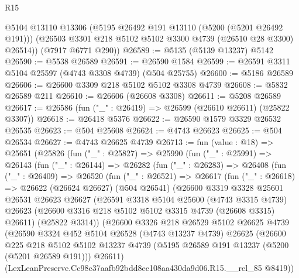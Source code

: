 \begin{lexlean}{R15}
\begin{coremodule}
{{{{{{{{{{{        @5104
        @13110
        @13306
        (@5195 @26492 @191 @13110 (@5200 (@5201 @26492 @191)))
        (@26503 @3301 @218 @5102 @5102 @3300 @4739 (@26510 @28 @3300) @26514))
      (@7917 @6771 @290))
@26589 := @5135 (@5139 @13237) @5142
@26590 := @5538 @26589
@26591 := @26590 @1584
@26599 := @26591 @3311 @5104 @25597 (@4743 @3308 @4739) (@504 @25755)
@26600 := @5186 @26589
@26606 := @26600 @3309 @218 @5102 @5102 @3308 @4739
@26608 := @5832 @26589 @211
@26610 := @26606 (@26608 @3308)
@26611 := @5208 @26589
@26617 := @26586 (fun ("_" : @26419) => @26599 (@26610 @26611) (@25822 @3307))
@26618 := @26418 @5376
@26622 := @26590 @1579 @3329 @26532 @26535
@26623 := @504 @25608
@26624 := @4743 @26623
@26625 := @504 @26534
@26627 := @4743 @26625 @4739
@26713 := fun (value : @18) =>
  @25651
    (@25826
      (fun ("_" : @25827) =>
      @25990
        (fun ("_" : @25991) =>
        @26143
          (fun ("_" : @26144) =>
          @26282
            (fun ("_" : @26283) =>
            @26408
              (fun ("_" : @26409) =>
              @26520
                (fun ("_" : @26521) =>
                @26617
                  (fun ("_" : @26618) =>
                  @26622
                    (@26624 @26627)
                    (@504 @26541)
                    (@26600
                      @3319
                      @3328
                      @25601
                      @26531
                      @26623
                      @26627
                      (@26591
                        @3318
                        @5104
                        @25600
                        (@4743 @3315 @4739)
                        @26623
                        (@26600 @3316 @218 @5102 @5102 @3315 @4739 (@26608 @3315) @26611)
                        (@25822 @3314))
                      (@26600
                        @3326
                        @218
                        @26529
                        @5102
                        @26625
                        @4739
                        (@26590
                          @3324
                          @452
                          @5104
                          @26528
                          (@4743 @13237 @4739)
                          @26625
                          (@26600
                            @225
                            @218
                            @5102
                            @5102
                            @13237
                            @4739
                            (@5195 @26589 @191 @13237 (@5200 (@5201 @26589 @191)))
                            @26611)
                          (LexLeanPreserve.Cc98c37aafb92bdd8ec108aa430da9d06.R15.__rel_85 @8419))
}}}}}}}}}}}
\end{coremodule}
\end{lexlean}

